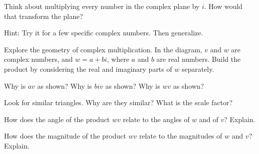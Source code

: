 \documentclass{ximera}
\begin{document}
\begin{question}
Think about multiplying every number in the complex plane by $i$.  How would that transform the plane?  

Hint: Try it for a few specific complex numbers.  Then generalize.  
\begin{freeResponse}
\end{freeResponse}

\end{question}


\begin{question}
Explore the geometry of complex multiplication. In the diagram, $v$ and $w$ are complex numbers, and $w=a+bi$, where $a$ and $b$ are real numbers. Build the product by considering the real and imaginary parts of $w$ separately. 


\begin{center}
\end{center}


Why is $av$ as shown? Why is $biv$ as shown? Why is $wv$ as shown?

\begin{freeResponse}
\end{freeResponse}


Look for similar triangles. Why are they similar? What is the scale factor?
\begin{freeResponse}
\end{freeResponse}


How does the angle of the product $wv$ relate to the angles of $w$ and of $v$? Explain.
\begin{freeResponse}
\end{freeResponse}


How does the magnitude of the product $wv$ relate to the magnitudes of $w$ and $v$? Explain.
\begin{freeResponse}
\end{freeResponse}


\end{question}
\end{document}
